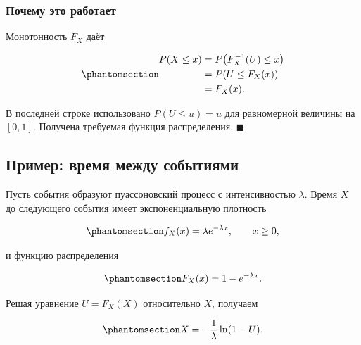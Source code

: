 \documentclass[
  russian,
  11pt,
  a4paper,
  open=any]{scrbook}
\begin{document}
\begin{bookderivation}

\subsubsection{Почему это
работает}\label{ux43fux43eux447ux435ux43cux443-ux44dux442ux43e-ux440ux430ux431ux43eux442ux430ux435ux442}

Монотонность \(F_X\) даёт

\begin{equation}\protect\phantomsection\label{eq-ch8-inverse-transform-proof}{
\begin{aligned}
P(X\leq x)
&=P\!\left(F_X^{-1}(U)\leq x\right)\\
&=P\!\left(U\leq F_X(x)\right)\\
&=F_X(x).
\end{aligned}
}\end{equation}

В последней строке использовано \(P(U\leq u)=u\) для равномерной
величины на \([0,1]\). Получена требуемая функция распределения.
\(\blacksquare\)

\end{bookderivation}

\subsection{Пример: время между
событиями}\label{ux43fux440ux438ux43cux435ux440-ux432ux440ux435ux43cux44f-ux43cux435ux436ux434ux443-ux441ux43eux431ux44bux442ux438ux44fux43cux438}

Пусть события образуют пуассоновский процесс с интенсивностью
\(\lambda\). Время \(X\) до следующего события имеет экспоненциальную
плотность

\begin{equation}\protect\phantomsection\label{eq-ch8-exponential-density}{
f_X(x)=\lambda e^{-\lambda x},
\qquad x\geq0,
}\end{equation}

и функцию распределения

\begin{equation}\protect\phantomsection\label{eq-ch8-exponential-cdf}{
F_X(x)=1-e^{-\lambda x}.
}\end{equation}

Решая уравнение \(U=F_X(X)\) относительно \(X\), получаем

\begin{equation}\protect\phantomsection\label{eq-ch8-exponential-inverse-transform}{
X=-\frac{1}{\lambda}\ln(1-U).
}\end{equation}
\end{document}
